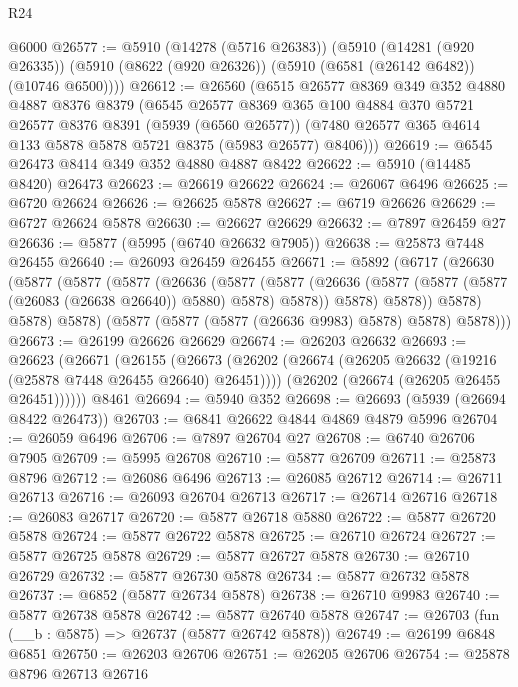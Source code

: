 \begin{lexlean}{R24}
\begin{coremodule}
    @6000
@26577 := @5910
    (@14278 (@5716 @26383))
    (@5910
      (@14281 (@920 @26335))
      (@5910 (@8622 (@920 @26326)) (@5910 (@6581 (@26142 @6482)) (@10746 @6500))))
@26612 := @26560
    (@6515
      @26577
      @8369
      @349
      @352
      @4880
      @4887
      @8376
      @8379
      (@6545
        @26577
        @8369
        @365
        @100
        @4884
        @370
        @5721
        @26577
        @8376
        @8391
        (@5939 (@6560 @26577))
        (@7480 @26577 @365 @4614 @133 @5878 @5878 @5721 @8375 (@5983 @26577) @8406)))
@26619 := @6545 @26473 @8414 @349 @352 @4880 @4887 @8422
@26622 := @5910 (@14485 @8420) @26473
@26623 := @26619 @26622
@26624 := @26067 @6496
@26625 := @6720 @26624
@26626 := @26625 @5878
@26627 := @6719 @26626
@26629 := @6727 @26624 @5878
@26630 := @26627 @26629
@26632 := @7897 @26459 @27
@26636 := @5877 (@5995 (@6740 @26632 @7905))
@26638 := @25873 @7448 @26455
@26640 := @26093 @26459 @26455
@26671 := @5892
    (@6717
      (@26630
        (@5877
          (@5877
            (@5877
              (@26636
                (@5877
                  (@5877
                    (@26636 (@5877 (@5877 (@5877 (@26083 (@26638 @26640)) @5880) @5878) @5878))
                    @5878)
                  @5878))
              @5878)
            @5878)
          @5878)
        (@5877 (@5877 (@5877 (@26636 @9983) @5878) @5878) @5878)))
@26673 := @26199 @26626 @26629
@26674 := @26203 @26632
@26693 := @26623
    (@26671
      (@26155
        (@26673
          (@26202 (@26674 (@26205 @26632 (@19216 (@25878 @7448 @26455 @26640) @26451))))
          (@26202 (@26674 (@26205 @26455 @26451))))))
    @8461
@26694 := @5940 @352
@26698 := @26693 (@5939 (@26694 @8422 @26473))
@26703 := @6841 @26622 @4844 @4869 @4879 @5996
@26704 := @26059 @6496
@26706 := @7897 @26704 @27
@26708 := @6740 @26706 @7905
@26709 := @5995 @26708
@26710 := @5877 @26709
@26711 := @25873 @8796
@26712 := @26086 @6496
@26713 := @26085 @26712
@26714 := @26711 @26713
@26716 := @26093 @26704 @26713
@26717 := @26714 @26716
@26718 := @26083 @26717
@26720 := @5877 @26718 @5880
@26722 := @5877 @26720 @5878
@26724 := @5877 @26722 @5878
@26725 := @26710 @26724
@26727 := @5877 @26725 @5878
@26729 := @5877 @26727 @5878
@26730 := @26710 @26729
@26732 := @5877 @26730 @5878
@26734 := @5877 @26732 @5878
@26737 := @6852 (@5877 @26734 @5878)
@26738 := @26710 @9983
@26740 := @5877 @26738 @5878
@26742 := @5877 @26740 @5878
@26747 := @26703 (fun (__b : @5875) => @26737 (@5877 @26742 @5878))
@26749 := @26199 @6848 @6851
@26750 := @26203 @26706
@26751 := @26205 @26706
@26754 := @25878 @8796 @26713 @26716

\end{coremodule}
\end{lexlean}
